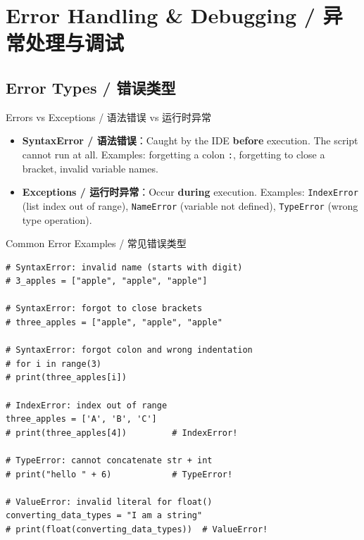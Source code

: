 \documentclass[11pt,a4paper]{report}
\let\oldtexttt\texttt
\renewcommand{\texttt}[1]{\textcolor{mainblue}{\oldtexttt{#1}}}
\begin{document}
\section{Error Handling \& Debugging / 异常处理与调试}

\subsection{Error Types / 错误类型}

\begin{concept}{Errors vs Exceptions / 语法错误 vs 运行时异常}
    \begin{itemize}[itemsep=0.8em]
        \item \textbf{SyntaxError / 语法错误}：Caught by the IDE \textbf{before} execution. The script cannot run at all. Examples: forgetting a colon \texttt{:}, forgetting to close a bracket, invalid variable names.
        \item \textbf{Exceptions / 运行时异常}：Occur \textbf{during} execution. Examples: \texttt{IndexError} (list index out of range), \texttt{NameError} (variable not defined), \texttt{TypeError} (wrong type operation).
    \end{itemize}
\end{concept}

\begin{examplebox}{Common Error Examples / 常见错误类型}
\begin{lstlisting}
# SyntaxError: invalid name (starts with digit)
# 3_apples = ["apple", "apple", "apple"]

# SyntaxError: forgot to close brackets
# three_apples = ["apple", "apple", "apple"

# SyntaxError: forgot colon and wrong indentation
# for i in range(3)
# print(three_apples[i])

# IndexError: index out of range
three_apples = ['A', 'B', 'C']
# print(three_apples[4])         # IndexError!

# TypeError: cannot concatenate str + int
# print("hello " + 6)            # TypeError!

# ValueError: invalid literal for float()
converting_data_types = "I am a string"
# print(float(converting_data_types))  # ValueError!
\end{lstlisting}
\end{examplebox}
\end{document}
